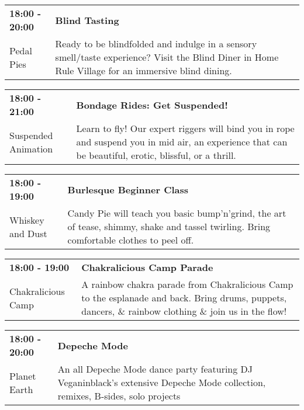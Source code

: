 \begin{tabular}{ p{1in} p{2.2in} }
    \textbf{18:00 - 20:00} & \textbf{Blind Tasting} \\
    Pedal Pies \newline  & Ready to be blindfolded and indulge in a sensory smell/taste experience? Visit the Blind Diner in Home Rule Village for an immersive blind dining. \\
    \hline 
\end{tabular}
    
\begin{tabular}{ p{1in} p{2.2in} }
    \textbf{18:00 - 21:00} & \textbf{Bondage Rides: Get Suspended!} \\
    Suspended Animation \newline  & Learn to fly! Our expert riggers will bind you in rope and suspend you in mid air, an experience that can be beautiful, erotic, blissful, or a thrill. \\
    \hline 
\end{tabular}
    
\begin{tabular}{ p{1in} p{2.2in} }
    \textbf{18:00 - 19:00} & \textbf{Burlesque Beginner Class } \\
    Whiskey and Dust \newline  & Candy Pie will teach you basic bump'n'grind, the art of tease, shimmy, shake and tassel twirling. Bring comfortable clothes to peel off. \\
    \hline 
\end{tabular}
    
\begin{tabular}{ p{1in} p{2.2in} }
    \textbf{18:00 - 19:00} & \textbf{Chakralicious Camp Parade} \\
    Chakralicious Camp \newline  & A rainbow chakra parade from Chakralicious Camp to the esplanade and back. Bring drums, puppets, dancers, \& rainbow clothing \& join us in the flow! \\
    \hline 
\end{tabular}
    
\begin{tabular}{ p{1in} p{2.2in} }
    \textbf{18:00 - 20:00} & \textbf{Depeche Mode} \\
    Planet Earth \newline  & An all Depeche Mode dance party featuring DJ Veganinblack's extensive Depeche Mode collection, remixes, B-sides, solo projects \\
    \hline 
\end{tabular}
    
